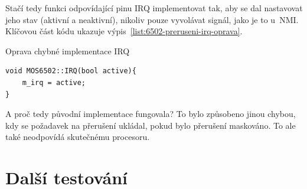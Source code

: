 Stačí tedy funkci odpovídající pinu IRQ implementovat tak, aby se dal nastavovat jeho stav (aktivní a neaktivní), nikoliv pouze vyvolávat signál, jako je to u~NMI. Klíčovou část kódu ukazuje výpis~\ref{list:6502-preruseni-irq-oprava}.

\begin{listing}
	\caption{Oprava chybné implementace IRQ}
	\label{list:6502-preruseni-irq-oprava}
	\begin{verbatim}
void MOS6502::IRQ(bool active){
	m_irq = active;
}
	\end{verbatim}
\end{listing}


\begin{note}
A proč tedy původní implementace fungovala? To bylo způsobeno jinou chybou, kdy se požadavek na přerušení ukládal, pokud bylo přerušení maskováno. To ale také neodpovídá skutečnému procesoru.
\end{note}

\section{Další testování}